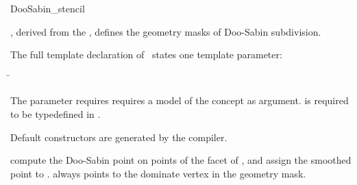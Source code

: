 \begin{ccRefClass}{DooSabin_stencil}

\ccDefinition

\ccClassTemplateName , derived from the , 
defines the geometry masks of Doo-Sabin subdivision. 


\ccParameters

The full template declaration of \ccClassTemplateName\ states one
template parameter:

\begin{tabbing}
 \= 
\end{tabbing}
   
The  parameter requires requires a model of 
the  concept as argument. 
 is required to be typedefined in .

\ccCreation

Default constructors are generated by the compiler.

\ccThree{}{}{}

{compute the Doo-Sabin point on points of the facet of , 
and assign the smoothed point to .  always 
points to the dominate vertex in the geometry mask.}


\ccSeeAlso

\\
\\

\end{ccRefClass}

\ccRefPageEnd


